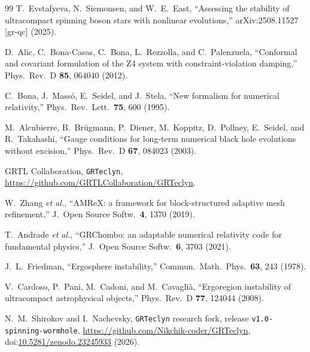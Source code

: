 \documentclass[twocolumn,floatfix,aps,prd,superscriptaddress,nofootinbib]{revtex4-2}
\begin{document}
\begin{thebibliography}{99}
T.~Evstafyeva, N.~Siemonsen, and W.~E.~East,
\newblock ``Assessing the stability of ultracompact spinning boson stars with nonlinear evolutions,''
\newblock arXiv:2508.11527 [gr-qc] (2025).

D.~Alic, C.~Bona-Casas, C.~Bona, L.~Rezzolla, and C.~Palenzuela,
\newblock ``Conformal and covariant formulation of the Z4 system with constraint-violation damping,''
\newblock Phys.\ Rev.\ D \textbf{85}, 064040 (2012).

C.~Bona, J.~Mass\'o, E.~Seidel, and J.~Stela,
\newblock ``New formalism for numerical relativity,''
\newblock Phys.\ Rev.\ Lett.\ \textbf{75}, 600 (1995).

M.~Alcubierre, B.~Br\"ugmann, P.~Diener, M.~Koppitz, D.~Pollney, E.~Seidel, and R.~Takahashi,
\newblock ``Gauge conditions for long-term numerical black hole evolutions without excision,''
\newblock Phys.\ Rev.\ D \textbf{67}, 084023 (2003).

GRTL Collaboration,
\newblock \texttt{GRTeclyn},
\newblock \url{https://github.com/GRTLCollaboration/GRTeclyn}.

W.~Zhang \emph{et al.},
\newblock ``AMReX: a framework for block-structured adaptive mesh refinement,''
\newblock J.\ Open Source Softw.\ \textbf{4}, 1370 (2019).

T.~Andrade \emph{et al.},
\newblock ``GRChombo: an adaptable numerical relativity code for fundamental physics,''
\newblock J.\ Open Source Softw.\ \textbf{6}, 3703 (2021).

J.~L.~Friedman,
\newblock ``Ergosphere instability,''
\newblock Commun.\ Math.\ Phys.\ \textbf{63}, 243 (1978).

V.~Cardoso, P.~Pani, M.~Cadoni, and M.~Cavagli\`a,
\newblock ``Ergoregion instability of ultracompact astrophysical objects,''
\newblock Phys.\ Rev.\ D \textbf{77}, 124044 (2008).

N.~M.~Shirokov and I.~Nachevsky,
\newblock \texttt{GRTeclyn} research fork, release \texttt{v1.0-spinning-wormhole},
\newblock \url{https://github.com/Nikchik-coder/GRTeclyn},
\newblock doi:\href{https://doi.org/10.5281/zenodo.23245933}{10.5281/zenodo.23245933} (2026).

\end{thebibliography}
\end{document}
